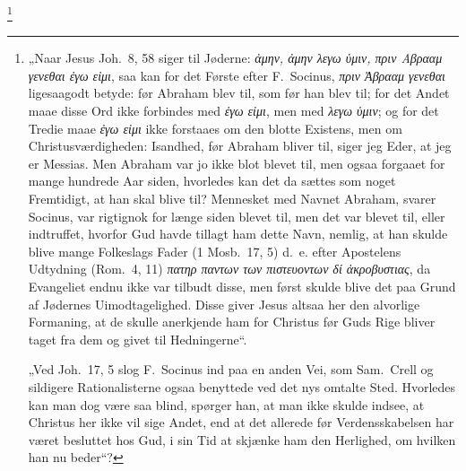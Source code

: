 \documentclass[12pt]{book}
\begin{document}
\footnote{„Naar Jesus Joh.\ 8, 58 siger til Jøderne:
\textit{ἀμην, ἀμην λεγω ὑμιν, πριν Αβρααμ γενεθαι ἐγω εἰμι}, saa kan
for det Første efter F.\ Socinus, \textit{πριν Ἀβρααμ γενεθαι}
ligesaagodt betyde: før Abraham blev til, som før han blev til; for
det Andet maae disse Ord ikke forbindes med \textit{ἐγω εἰμι}, men
med \textit{λεγω ὑμιν}; og for det Tredie maae \textit{ἐγω εἰμι} ikke
forstaaes om den blotte Existens, men om Christusværdigheden:
Isandhed, før Abraham bliver til, siger jeg Eder, at jeg er Messias.
Men Abraham var jo ikke blot blevet til, men ogsaa forgaaet for mange
hundrede Aar siden, hvorledes kan det da sættes som noget Fremtidigt,
at han skal blive til? Mennesket med Navnet Abraham, svarer Socinus,
var rigtignok for længe siden blevet til, men det var blevet til,
eller indtruffet, hvorfor Gud havde tillagt ham dette Navn, nemlig,
at han skulde blive mange Folkeslags Fader (1 Mosb.\ 17, 5)
d.\ e. efter Apostelens Udtydning (Rom.\ 4, 11) \textit{πατηρ παντων
των πιστευοντων δί ἀκροβυστιας}, da Evangeliet endnu ikke var tilbudt
disse, men først skulde blive det paa Grund af Jødernes
Uimodtagelighed. Disse giver Jesus altsaa her den alvorlige
Formaning, at de skulle anerkjende ham for Christus før Guds Rige
bliver taget fra dem og givet til Hedningerne“.

„Ved Joh.\ 17, 5 slog F.\ Socinus ind paa en anden Vei, som
Sam.\ Crell og sildigere Rationalisterne ogsaa benyttede ved det nys
omtalte Sted. Hvorledes kan man dog være saa blind, spørger han, at
man ikke skulde indsee, at Christus her ikke vil sige Andet, end at
det allerede før Verdensskabelsen har været besluttet hos Gud, i sin
Tid at skjænke ham den Herlighed, om hvilken han nu beder“?

}
\end{document}
